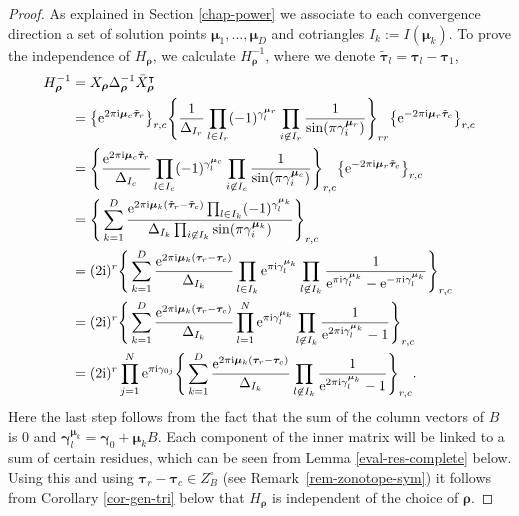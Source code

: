 \documentclass[pdftex]{sigma}
\numberwithin{equation}{section}
\begin{document}
\begin{proof}
As explained in Section \ref{chap-power} we associate to each convergence direction a set of solution points $\bm{\mu}_1,\dots,\bm{\mu}_D$ and cotriangles $I_k := I(\bm{\mu}_k).$ To prove the independence of $H_{\bm\rho}$,
we calculate $H^{-1}_{\bm\rho}$, where we denote $\tilde{\bm{\tau}}_l = \bm{\tau}_l - \bm{\tau}_1$,
\begin{align*}
H_{\bm\rho}^{-1}&= X_{\bm\rho} \Delta_{\bm\rho}^{-1} \bar{X}_{\bm\rho}^{\intercal}\\
&= \big\{{\rm e}^{2\pi {\rm i}\bm{\mu}_c \tilde{\bm{\tau}}_r}\big\}_{r,c}
\Bigg\{\frac{1}{\Delta_{I_r}} \prod_{l \in I_r} (-1)^{\gamma_l^{\bm\mu_r}}\prod_{i \not \in I_r} \frac{1}{\sin(\pi \gamma_i^{\bm\mu_r})}\Bigg\}_{rr}
\big\{{\rm e}^{-2\pi {\rm i}\bm{\mu}_r \tilde{\bm{\tau}}_c}\big\}_{r,c}
\\
&= \Bigg\{\frac{{\rm e}^{2\pi {\rm i}\bm{\mu}_c \tilde{\bm{\tau}}_r}}{\Delta_{I_c}} \prod_{l \in I_c} (-1)^{\gamma_l^{\bm\mu_c}}\prod_{i \not \in I_c} \frac{1}{\sin(\pi \gamma_i^{\bm\mu_c})}\Bigg\}_{r,c}
\big\{{\rm e}^{-2\pi {\rm i}\bm{\mu}_r \tilde{\bm{\tau}}_c}\big\}_{r,c}
\\
&= \Bigg\{\sum_{k=1}^D \frac{{\rm e}^{2\pi {\rm i}\bm{\mu}_k (\tilde{\bm{\tau}}_r - \tilde{\bm{\tau}}_c)}\prod_{l \in I_k} (-1)^{\gamma_l^{\bm\mu_k}}}{\Delta_{I_k}\prod_{i \not \in I_k} \sin(\pi \gamma_i^{\bm\mu_k})} \Bigg\}_{r,c}\\
&=(2{\rm i})^r\Bigg\{\sum_{k=1}^D \frac{{\rm e}^{2\pi {\rm i}\bm{\mu}_k (\bm{\tau}_r - \bm{\tau}_c)}}{\Delta_{I_k}}\prod_{l \in I_k} {\rm e}^{\pi {\rm i} \gamma_l^{\bm\mu_k}}\prod_{l \not \in I_k} \frac{1}{{\rm e}^{\pi {\rm i} \gamma_l^{\bm\mu_k}} - {\rm e}^{-\pi {\rm i} \gamma_l^{\bm\mu_k}}} \Bigg\}_{r,c} \\
&= (2{\rm i})^r \Bigg\{\sum_{k=1}^D \frac{{\rm e}^{2\pi {\rm i}\bm{\mu}_k (\bm{\tau}_r - \bm{\tau}_c)}}{\Delta_{I_k}}\prod_{l = 1}^N {\rm e}^{\pi {\rm i} \gamma_l^{\bm\mu_k}}\prod_{l \not \in I_k} \frac{1}{{\rm e}^{2\pi {\rm i} \gamma_l^{\bm\mu_k}} - 1} \Bigg\}_{r,c} \\
&= (2{\rm i})^r \prod_{j=1}^N {\rm e}^{\pi {\rm i} \gamma_{0j}}\Bigg\{\sum_{k=1}^D \frac{{\rm e}^{2\pi {\rm i}\bm{\mu}_k (\bm{\tau}_r - \bm{\tau}_c)}}{\Delta_{I_k}}\prod_{l \not \in I_k} \frac{1}{{\rm e}^{2\pi {\rm i} \gamma_l^{\bm\mu_k}} - 1} \Bigg\}_{r,c}.
\end{align*}
Here the last step follows from the fact that the sum of the column vectors of $B$ is $0$ and $\bm\gamma_l^{\bm \mu_k} = \bm\gamma_0 + \bm{\mu}_kB$.
Each component of the inner matrix will be linked to a sum of certain residues, which can be seen from Lemma \ref{eval-res-complete} below. Using this and using
$\bm{\tau}_{r} - \bm{\tau}_{c} \in Z_B^{\circ}$ (see Remark~\ref{rem-zonotope-sym}) it follows from Corollary \ref{cor-gen-tri} below that $H_{\bm\rho}$ is independent of the choice
of $\bm\rho$.
\end{proof}
\end{document}
